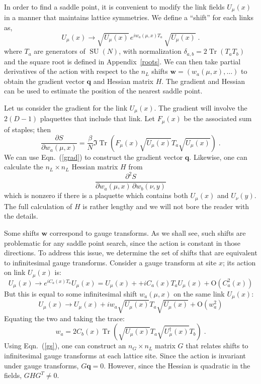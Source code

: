 \documentclass[preprint,aps,prd]{revtex4-2}
\newcommand{\da}{\dagger}  %
\newcommand{\be}{\begin{equation}}
\newcommand{\eq}{\end{equation}}
\DeclareMathOperator{\SU}{SU}
\DeclareMathOperator{\Tr}{Tr}
\begin{document}
In order to find a saddle point, it is convenient to modify
the link fields $U_\mu(x)$ in a manner that maintains lattice symmetries.
We define a ``shift'' for each links as,
\be
  U_\mu(x) \to \sqrt{U_\mu(x)}\, e^{i w_{a}(\mu, x) T_a}\, \sqrt{U_\mu(x)} \; .
    \label{shifts}
\eq
where $T_a$ are generators of $\SU(N)$, with normalization
$\delta_{a,b} = 2 \Tr(T_a T_b)$ and the square root is defined
in Appendix~\ref{roots}.
We can then take partial derivatives of the action with
respect to the $n_L$ shifts $\mathbf{w} = \left(w_a(\mu, x), \ldots\right)$
to obtain the gradient vector $\mathbf{q}$ and Hessian matrix
$H$.  The gradient and Hessian can be used to estimate the
position of the nearest saddle point.

Let us consider the gradient for the link $U_\mu(x)$.
The gradient will involve the $2 (D-1)$ plaquettes that include that link.
Let $F_\mu(x)$ be the associated sum of staples; then
\be
   \frac{\partial S}{\partial w_a(\mu, x)} = \frac{\beta}{N}
   \Im\Tr\left(F_\mu(x) \sqrt{U_\mu(x)} T_a \sqrt{U_\mu(x)}\right) \; .
   \label{grad}
\eq
We can use Eqn.~(\ref{grad}) to construct the gradient vector $\mathbf{q}$.
Likewise, one can calculate the $n_L\times n_L$ Hessian matrix
$H$ from
\be
   \frac{\partial^2 S}{\partial w_a(\mu, x)\, \partial w_b(\nu, y)}
\eq
which is nonzero if there is a plaquette which contains both
$U_\mu(x)$ and $U_\nu(y)$.
The full calculation of $H$ is rather lengthy and we will not bore the reader
with the details.

Some shifts $\mathbf{w}$ correspond to gauge transforms.
As we shall see, such shifts are problematic for any saddle
point search, since the action is constant in those directions.
To address this issue, we determine the set of shifts that are
equivalent to infinitesimal gauge transforms.  Consider a gauge transform
at site $x$; its action on link $U_\mu(x)$ is:
\be
U_\mu(x) \to e^{i C_a(x) T_a} U_\mu(x) = U_\mu(x)+ + i C_a(x) T_a U_\mu(x) +
       \mathrm{O}\!\left(C_a^2(x)\right)
\eq
But this is equal to some infinitesimal shift $w_a(\mu, x)$ on
the same link $U_\mu(x)$:
\be
U_\mu(x) \to U_\mu(x) + i w_a \sqrt{U_\mu(x)}T_a \sqrt{U_\mu(x)} +
       \mathrm{O}\!\left(w_a^2\right)
\eq
%
Equating the two and taking the trace:
\be
w_a = 2 C_b(x) \Tr\left(\sqrt{U_\mu(x)} T_a
                     \sqrt{U_\mu^\da(x)} T_b\right) \; . \label{gs}
\eq
Using Eqn.~(\ref{gs}), one can construct an $n_G \times n_L$ matrix
$G$ that relates shifts to infinitesimal gauge transforms
at each lattice site.
Since the action is invariant under gauge transforms, $G \mathbf{q} = 0$.
However, since the Hessian is quadratic in the fields, $G H G^T \neq 0$.
\end{document}
